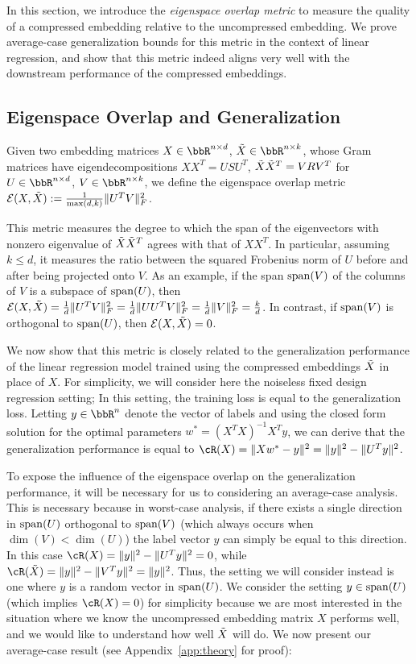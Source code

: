 In this section, we introduce the \textit{eigenspace overlap metric} to measure the quality of a compressed embedding relative to the uncompressed embedding.
We prove average-case generalization bounds for this metric in the context of linear regression, and show that this metric indeed aligns very well with the downstream performance of the compressed embeddings.

\subsection{Eigenspace Overlap and Generalization}
\label{subsec:eigen_overlap}
\begin{definition}
Given two embedding matrices $X \in \RR^{n \times d}$, $\tX \in \RR^{n \times k}$, whose Gram matrices have eigendecompositions $XX^T = USU^T$, $\tX\tX^T = VRV^T$ for $U \in \RR^{n\times d}$, $V\in \RR^{n \times k}$, we define the eigenspace overlap metric $\eigover(X,\tX) \defeq  \frac{1}{\max(d,k)}\|U^T V\|_F^2$.
\end{definition}

This metric measures the degree to which the span of the eigenvectors with nonzero eigenvalue of $\tX\tX^T$ agrees with that of $XX^T$.
In particular, assuming $k\leq d$, it measures the ratio between the squared Frobenius norm of $U$ before and after being projected onto $V$.
As an example, if the span $\Span(V)$ of the columns of $V$ is a subspace of $\Span(U)$, then $\eigover(X,\tX) = \frac{1}{d}\|U^T V\|_F^2 = \frac{1}{d}\|UU^T V\|_F^2 = \frac{1}{d}\|V\|_F^2 = \frac{k}{d}$.
In contrast, if $\Span(V)$ is orthogonal to $\Span(U)$, then $\eigover(X,\tX) = 0$.

We now show that this metric is closely related to the generalization performance of the linear regression model trained using the compressed embeddings $\tX$ in place of $X$.
For simplicity, we will consider here the noiseless fixed design regression setting;
In this setting, the training loss is equal to the generalization loss.
Letting $y\in\RR^n$ denote the vector of labels and using the closed form solution for the optimal parameters $w^* = (X^T X)^{-1}X^Ty$, we can derive that the generalization performance is equal to $\cR(X) = \|Xw^* - y\|^2 = \|y\|^2 - \|U^T y\|^2$.

To expose the influence of the eigenspace overlap on the generalization performance, it will be necessary for us to considering an average-case analysis.
This is necessary because in worst-case analysis, if there exists a single direction in $\Span(U)$ orthogonal to $\Span(V)$ (which always occurs when $\dim(V) < \dim(U)$) the label vector $y$ can simply be equal to this direction.
In this case $\cR(X) = \|y\|^2 - \|U^T y\|^2 = 0$, while $\cR(\tX) = \|y\|^2 - \|V^T y\|^2 = \|y\|^2$.
Thus, the setting we will consider instead is one where $y$ is a random vector in $\Span(U)$.
We consider the setting $y \in \Span(U)$ (which implies $\cR(X) = 0$) for simplicity because we are most interested in the situation where we know the uncompressed embedding matrix $X$ performs well, and we would like to understand how well $\tX$ will do.
We now present our average-case result (see Appendix~\ref{app:theory} for proof):

